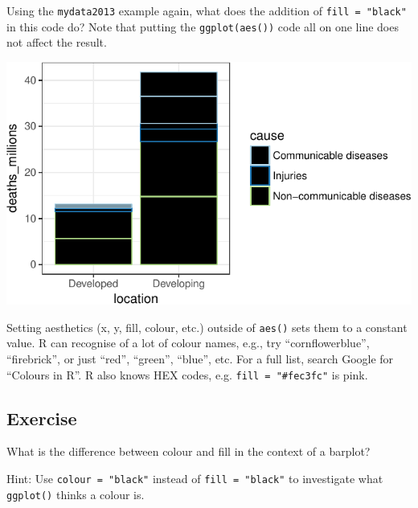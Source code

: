 \documentclass[12pt,]{krantz}
\makeatletter
\newenvironment{Shaded}{\begin{snugshade}}{\end{snugshade}}
\newcommand{\DataTypeTok}[1]{\textcolor[rgb]{0.13,0.29,0.53}{#1}}
\newcommand{\KeywordTok}[1]{\textcolor[rgb]{0.13,0.29,0.53}{\textbf{#1}}}
\newcommand{\NormalTok}[1]{#1}
\newcommand{\OperatorTok}[1]{\textcolor[rgb]{0.81,0.36,0.00}{\textbf{#1}}}
\newcommand{\StringTok}[1]{\textcolor[rgb]{0.31,0.60,0.02}{#1}}
\newenvironment{kframe}{%
\medskip{}
\setlength{\fboxsep}{.8em}
 \def\at@end@of@kframe{}%
 \ifinner\ifhmode%
  \def\at@end@of@kframe{\end{minipage}}%
  \begin{minipage}{\columnwidth}%
 \fi\fi%
 \def\FrameCommand##1{\hskip\@totalleftmargin \hskip-\fboxsep
 \colorbox{shadecolor}{##1}\hskip-\fboxsep
     \hskip-\linewidth \hskip-\@totalleftmargin \hskip\columnwidth}%
 \MakeFramed {\advance\hsize-\width
   \@totalleftmargin\z@ \linewidth\hsize
   \@setminipage}}%
 {\par\unskip\endMakeFramed%
 \at@end@of@kframe}
\renewenvironment{Shaded}{\begin{kframe}}{\end{kframe}}
\theoremstyle{definition}
\theoremstyle{definition}
\theoremstyle{definition}
\theoremstyle{remark}
\makeatother
\begin{document}
Using the \texttt{mydata2013} example again, what does the addition of
\texttt{fill\ =\ "black"} in this code do? Note that putting the
\texttt{ggplot(aes())} code all on one line does not affect the result.

\begin{Shaded}
\end{Shaded}

\includegraphics{01_first_interaction_files/figure-latex/unnamed-chunk-7-1.pdf}

Setting aesthetics (x, y, fill, colour, etc.) outside of \texttt{aes()}
sets them to a constant value. R can recognise of a lot of colour names,
e.g., try ``cornflowerblue'', ``firebrick'', or just ``red'', ``green'',
``blue'', etc. For a full list, search Google for ``Colours in R''. R
also knows HEX codes, e.g. \texttt{fill\ =\ "\#fec3fc"} is pink.

\hypertarget{exercise-1}{%
\subsection{Exercise}\label{exercise-1}}

What is the difference between colour and fill in the context of a
barplot?

Hint: Use \texttt{colour\ =\ "black"} instead of
\texttt{fill\ =\ "black"} to investigate what \texttt{ggplot()} thinks a
colour is.
\end{document}
